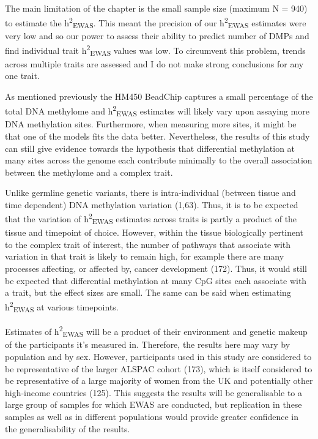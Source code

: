\documentclass[11pt,oneside]{bristolthesis}
\begin{document}
The main limitation of the chapter is the small sample size (maximum N = 940) to estimate the h\textsuperscript{2}\textsubscript{EWAS}. This meant the precision of our h\textsuperscript{2}\textsubscript{EWAS} estimates were very low and so our power to assess their ability to predict number of DMPs and find individual trait h\textsuperscript{2}\textsubscript{EWAS} values was low. To circumvent this problem, trends across multiple traits are assessed and I do not make strong conclusions for any one trait.

As mentioned previously the HM450 BeadChip captures a small percentage of the total DNA methylome and h\textsuperscript{2}\textsubscript{EWAS} estimates will likely vary upon assaying more DNA methylation sites. Furthermore, when measuring more sites, it might be that one of the models fits the data better. Nevertheless, the results of this study can still give evidence towards the hypothesis that differential methylation at many sites across the genome each contribute minimally to the overall association between the methylome and a complex trait.

Unlike germline genetic variants, there is intra-individual (between tissue and time dependent) DNA methylation variation (1,63). Thus, it is to be expected that the variation of h\textsuperscript{2}\textsubscript{EWAS} estimates across traits is partly a product of the tissue and timepoint of choice. However, within the tissue biologically pertinent to the complex trait of interest, the number of pathways that associate with variation in that trait is likely to remain high, for example there are many processes affecting, or affected by, cancer development (172). Thus, it would still be expected that differential methylation at many CpG sites each associate with a trait, but the effect sizes are small. The same can be said when estimating h\textsuperscript{2}\textsubscript{EWAS} at various timepoints.

Estimates of h\textsuperscript{2}\textsubscript{EWAS} will be a product of their environment and genetic makeup of the participants it's measured in. Therefore, the results here may vary by population and by sex. However, participants used in this study are considered to be representative of the larger ALSPAC cohort (173), which is itself considered to be representative of a large majority of women from the UK and potentially other high-income countries (125). This suggests the results will be generalisable to a large group of samples for which EWAS are conducted, but replication in these samples as well as in different populations would provide greater confidence in the generalisability of the results.
\end{document}
